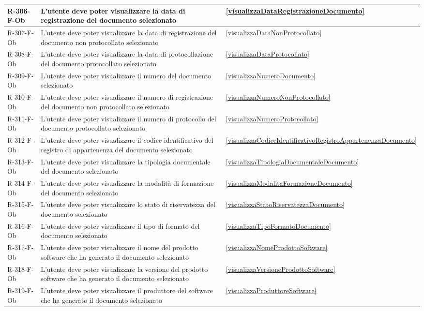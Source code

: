 \begin{longtable}{|p{2.5cm}|p{9.5cm}|p{2.5cm}|}
\hline
R-306-F-Ob & L'utente deve poter visualizzare la data di registrazione del documento selezionato & \ref{visualizzaDataRegistrazioneDocumento} \\
\hline
R-307-F-Ob & L'utente deve poter visualizzare la data di registrazione del documento non protocollato selezionato & \ref{visualizzaDataNonProtocollato} \\
\hline
R-308-F-Ob & L'utente deve poter visualizzare la data di protocollazione del documento protocollato selezionato & \ref{visualizzaDataProtocollato} \\
\hline
R-309-F-Ob & L'utente deve poter visualizzare il numero del documento selezionato & \ref{visualizzaNumeroDocumento} \\
\hline
R-310-F-Ob & L'utente deve poter visualizzare il numero di registrazione del documento non protocollato selezionato & \ref{visualizzaNumeroNonProtocollato} \\
\hline
R-311-F-Ob & L'utente deve poter visualizzare il numero di protocollo del documento protocollato selezionato & \ref{visualizzaNumeroProtocollato} \\
\hline
R-312-F-Ob & L'utente deve poter visualizzare il codice identificativo del registro di appartenenza del documento selezionato & \ref{visualizzaCodiceIdentificativoRegistroAppartenenzaDocumento} \\
\hline
R-313-F-Ob & L'utente deve poter visualizzare la tipologia documentale del documento selezionato & \ref{visualizzaTipologiaDocumentaleDocumento} \\
\hline
R-314-F-Ob & L'utente deve poter visualizzare la modalità di formazione del documento selezionato & \ref{visualizzaModalitaFormazioneDocumento} \\
\hline
R-315-F-Ob & L'utente deve poter visualizzare lo stato di riservatezza del documento selezionato & \ref{visualizzaStatoRiservatezzaDocumento} \\
\hline
R-316-F-Ob & L'utente deve poter visualizzare il tipo di formato del documento selezionato & \ref{visualizzaTipoFormatoDocumento} \\
\hline
R-317-F-Ob & L'utente deve poter visualizzare il nome del prodotto software che ha generato il documento selezionato & \ref{visualizzaNomeProdottoSoftware} \\
\hline
R-318-F-Ob & L'utente deve poter visualizzare la versione del prodotto software che ha generato il documento selezionato & \ref{visualizzaVersioneProdottoSoftware} \\
\hline
R-319-F-Ob & L'utente deve poter visualizzare il produttore del software che ha generato il documento selezionato & \ref{visualizzaProduttoreSoftware} \\

\end{longtable}

